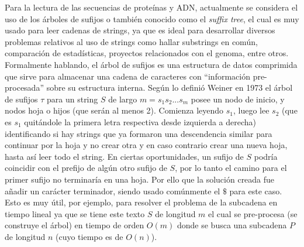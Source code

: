 Para la lectura de las secuencias de proteínas y ADN, actualmente se considera el uso de los árboles de sufijos \cite{pekka} o también conocido como el \textit{suffix tree}, el cual es muy usado para leer cadenas de strings, ya que es ideal para desarrollar diversos problemas relativos al uso de strings como hallar substrings en común, comparación de estadísticas, proyectos relacionados con el genoma, entre otros. \\
Formalmente hablando, el árbol de sufijos \cite{sufijos} es una estructura de datos comprimida que sirve para almacenar una cadena de caracteres con “información pre-procesada” sobre su estructura interna. Según lo definió Weiner en 1973 \cite{pavesi} el árbol de sufijos $\tau$ para un string $S$ de largo $m=s_{1}s_{2}...s_{m}$ posee un nodo de inicio, y nodos hoja o hijos (que serán al menos 2). Comienza leyendo $s_{1}$, luego lee $s_{2}$ (que es $s_{1}$ quitándole la primera letra respectiva desde izquierda a derecha) identificando si hay strings que ya formaron una descendencia similar para continuar por la hoja y no crear otra y en caso contrario crear una nueva hoja, hasta así leer todo el string. En ciertas oportunidades, un sufijo de $S$ podría coincidir con el prefijo de algún otro sufijo de $S$, por lo tanto el camino para el primer sufijo no terminaría en una hoja. Por ello que la solución creada fue añadir un carácter terminador, siendo usado comúnmente el $\$$ para este caso.
\\Esto es muy útil, por ejemplo, para resolver el problema de la subcadena en tiempo lineal ya que se tiene este texto $S$ de longitud $m$ el cual se pre-procesa (se construye el árbol) en tiempo de orden $O(m)$ donde se busca una subcadena $P$ de longitud $n$ (cuyo tiempo es de $O(n)$).

